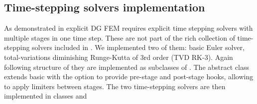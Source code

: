 \subsection{Time-stepping solvers implementation}
As demonstrated in  explicit DG FEM requires explicit time stepping solvers 
with multiple stages in one time step. These are not part of the rich collection of time-stepping 
solvers included in \sfepy{}. We implemented two of them: basic Euler solver, total-variations 
diminishing Runge-Kutta of 3rd order (TVD RK-3). Again following structure of \sfepy{} they are 
implemented as subclasses of . The abstract class 
 extends basic  with the option to provide 
pre-stage and post-stage hooks, allowing to apply limiters between stages. The two time-stepping 
solvers are then implemented in classes  and 

